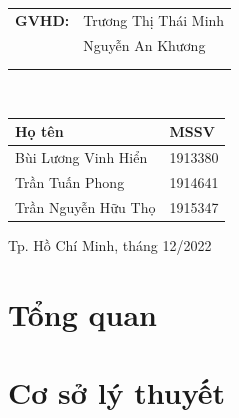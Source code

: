 \documentclass[a4paper]{report}
\theoremstyle{definition}
\begin{document}
\begin{titlepage}



	\begin{center}
		\begin{tabular}{m{1.5 cm}m{5.5cm}}
			\textbf{GVHD:} & Trương Thị Thái Minh \\
			& Nguyễn An Khương \\
			\\ \\
		\end{tabular}\\
		\begin{tabular}{m{5cm}m{2cm}}
			\hline
			\textbf{Họ tên}     & \textbf{MSSV} \\
			\hline
			Bùi Lương Vinh Hiển & 1913380       \\
			Trần Tuấn Phong     & 1914641       \\
			Trần Nguyễn Hữu Thọ & 1915347       \\
		\end{tabular}
	\end{center}


	\vspace{1.5cm}
	\begin{center}
		{\footnotesize Tp. Hồ Chí Minh, tháng 12/2022}
	\end{center}
\end{titlepage}

\newpage
\tableofcontents


\chapter{Tổng quan}



\chapter{Cơ sở lý thuyết}
% 

\end{document}

